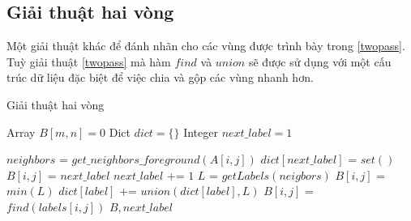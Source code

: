 \subsection{Giải thuật hai vòng}
Một giải thuật khác để đánh nhãn cho các vùng được trình bày trong \ref{twopass}. Tuỳ giải thuật \ref{twopass} mà hàm $find$ và $union$ sẽ được sử dụng với một cấu trúc dữ liệu đặc biệt để việc chia và gộp các vùng nhanh hơn.
\begin{algorithm}
  \caption{Giải thuật hai vòng}\label{twopass}
  \begin{algorithmic}[1]
    \State Array $B[m, n] = 0$ 
    \State Dict $dict = \{\}$
    \State Integer $next\_label = 1$
    
                \State $neighbors$ = $get\_neighbors\_foreground(A[i,j])$
                    \State $dict[next\_label]$ = $set()$
                    \State $B[i,j]$ = $next\_label$
                    \State $next\_label$ += $1$
                \Else
                    \State $L$ = $getLabels(neigbors)$
                    \State $B[i,j]$ = $min(L)$
                        \State $dict[label]$ += $union(dict[label], L)$
                    \EndFor
                \EndIf
            \EndIf
        \EndFor   
    \EndFor
                \State $B[i,j]$ = $find(labels[i,j])$
            \EndIf
        \EndFor   
    \EndFor
    \State \Return $B, next\_label$
    \EndProcedure
  \end{algorithmic}
\end{algorithm}
